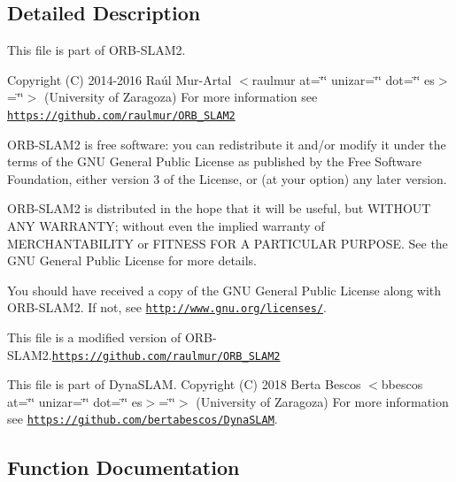 \subsection{Detailed Description}
This file is part of O\+R\+B-\/\+S\+L\+A\+M2.

Copyright (C) 2014-\/2016 Raúl Mur-\/\+Artal $<$raulmur at=\char`\"{}\char`\"{} unizar=\char`\"{}\char`\"{} dot=\char`\"{}\char`\"{} es$>$=\char`\"{}\char`\"{}$>$ (University of Zaragoza) For more information see \href{https://github.com/raulmur/ORB_SLAM2}{\tt https\+://github.\+com/raulmur/\+O\+R\+B\+\_\+\+S\+L\+A\+M2}

O\+R\+B-\/\+S\+L\+A\+M2 is free software\+: you can redistribute it and/or modify it under the terms of the G\+NU General Public License as published by the Free Software Foundation, either version 3 of the License, or (at your option) any later version.

O\+R\+B-\/\+S\+L\+A\+M2 is distributed in the hope that it will be useful, but W\+I\+T\+H\+O\+UT A\+NY W\+A\+R\+R\+A\+N\+TY; without even the implied warranty of M\+E\+R\+C\+H\+A\+N\+T\+A\+B\+I\+L\+I\+TY or F\+I\+T\+N\+E\+SS F\+OR A P\+A\+R\+T\+I\+C\+U\+L\+AR P\+U\+R\+P\+O\+SE. See the G\+NU General Public License for more details.

You should have received a copy of the G\+NU General Public License along with O\+R\+B-\/\+S\+L\+A\+M2. If not, see \href{http://www.gnu.org/licenses/}{\tt http\+://www.\+gnu.\+org/licenses/}.

This file is a modified version of O\+R\+B-\/\+S\+L\+A\+M2.\href{https://github.com/raulmur/ORB_SLAM2}{\tt https\+://github.\+com/raulmur/\+O\+R\+B\+\_\+\+S\+L\+A\+M2}

This file is part of Dyna\+S\+L\+AM. Copyright (C) 2018 Berta Bescos $<$bbescos at=\char`\"{}\char`\"{} unizar=\char`\"{}\char`\"{} dot=\char`\"{}\char`\"{} es$>$=\char`\"{}\char`\"{}$>$ (University of Zaragoza) For more information see \href{https://github.com/bertabescos/DynaSLAM}{\tt https\+://github.\+com/bertabescos/\+Dyna\+S\+L\+AM}. 

\subsection{Function Documentation}
